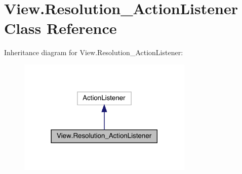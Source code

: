 \hypertarget{class_view_1_1_resolution___action_listener}{}\section{View.\+Resolution\+\_\+\+Action\+Listener Class Reference}
\label{class_view_1_1_resolution___action_listener}


Inheritance diagram for View.\+Resolution\+\_\+\+Action\+Listener\+:
\nopagebreak
\begin{figure}[H]
\begin{center}
\leavevmode
\includegraphics[width=237pt]{class_view_1_1_resolution___action_listener__inherit__graph}
\end{center}
\end{figure}


